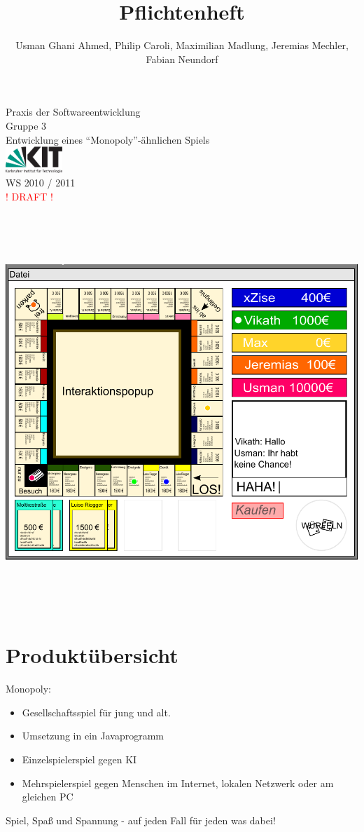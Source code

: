 \documentclass[a4paper,10pt]{article}
\title{Pflichtenheft}
\date{}
\author{Usman Ghani Ahmed, Philip Caroli, Maximilian Madlung, Jeremias Mechler, Fabian Neundorf}
\begin{document}
\maketitle
\begin{center}
\huge{Praxis der Softwareentwicklung \\
Gruppe 3 \\[0.5cm]
Entwicklung eines ``Monopoly''-ähnlichen Spiels \\[0.5cm]
\includegraphics[height=1cm]{kitlogo_de_rgb}  \\[0.5cm]
WS 2010 / 2011} \\[2cm]
\textcolor{red}{! DRAFT !}
\end{center}
\includegraphics[height=15cm]{spielfeld}

\newpage

\tableofcontents

\newpage

\section{Produktübersicht}
Monopoly:
\begin{itemize}
\item Gesellschaftsspiel für jung und alt.
\item Umsetzung in ein Javaprogramm
\item Einzelspielerspiel gegen KI
\item Mehrspielerspiel gegen Menschen im Internet, lokalen Netzwerk oder am gleichen PC
\end{itemize}
Spiel, Spaß und Spannung - auf jeden Fall für jeden was dabei!
\end{document}
